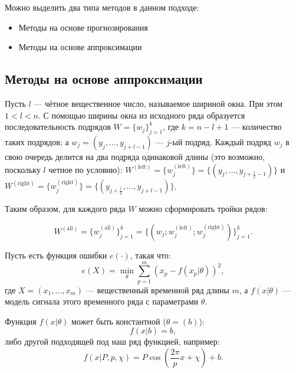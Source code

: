 \documentclass[%
12pt,
master,  %
natbib,      %
subf,        %
substylefile = spbu.rtx,
href,        %
colorlinks,  %
]{disser}
\begin{document}
Можно выделить два типа методов в данном подходе:
\begin{itemize}
	\item Методы на основе прогнозирования
	\item Методы на основе аппроксимации
\end{itemize}

\subsection{Методы на основе аппроксимации}

Пусть $l$ --- чётное вещественное число, называемое шириной окна. При этом  $ 1 < l < n $. С помощью ширины окна из исходного ряда образуется последовательность подрядов $W = \{ w_j \}_{j=1}^k$, где $k = n - l + 1$ --- количество таких подрядов; а $ w_j = (y_j, \dots, y_{j+l-1}) $ --- $j$-ый подряд. Каждый подряд  $w_j$  в свою очередь делится на два подряда одинаковой длины (это возможно, поскольку $l$ четное по условию): $ W^{\mathrm{(left)}} = \{w_j^{\mathrm{(left)}} \}  =  \{(y_j, \dots, y_{j+\frac{l}{2}-1}) \}$ и $W^{\mathrm{(right)}} = \{w_j^{\mathrm{(right)}} \} = \{(y_{j+\frac{l}{2}}, \dots, y_{j+l-1}) \}$.

Таким образом, для каждого ряда $W$ можно сформировать тройки рядов: 

\begin{equation*}
W^{\mathrm{(all)}} = \{w_j^{\mathrm{(all)}} \}_{j=1}^k =  \{(w_j; w_j^{\mathrm{(left)}}; w_j^{\mathrm{(right)}}) \}_{j=1}^k. 
\end{equation*}

Пусть есть функция ошибки $e(\cdot)$, такая что:
\begin{equation*}
e(X) = \min_{\theta}{\sum_{p=1}^m(x_p - f(x_p | \theta))^2 },
\end{equation*}
где $X = (x_1, \dots, x_m)$ ---  вещественный временной ряд длины $m$, а $f(x | \theta)$ --- модель сигнала этого временного ряда с параметрами $\theta$.


Функция $f(x|\theta)$ может быть константной ($\theta = (b)$):
\begin{equation*}
f(x | b) = b,
\end{equation*}
либо другой подходящей под наш ряд функцией, например:
\begin{equation*}
f(x | P, p, \chi) = P\cos(\frac{2\pi}{p}x + \chi) + b. 
\end{equation*}
\end{document}
